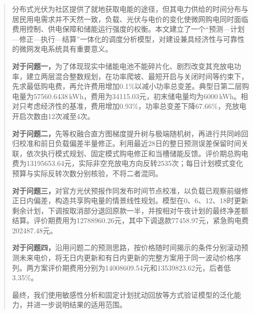 \begin{abstract}
分布式光伏为社区提供了就地获取电能的途径，但其电力供给的时间分布与居民用电需求并不天然一致，负载、光伏与电价的变化使微网购电同时面临费用控制、供电保障和储能运行强度的权衡。本文建立了一个“预测—计划—修正—执行—结算”一体化的调度分析模型，对建设兼具经济性与可靠性的微网发电系统具有重要意义。

\textbf{对于问题一，}为了体现现实中储能电池不能碎片化、剧烈改变其充放电功率，建立两层混合整数规划，在功率爬坡、最短开启与关闭时间等约束下，先求最低购电费，再允许费用增加0.1\%以减小功率总变差。典型日第二层购电量为57560.6438\,kWh，费用为34115.03元，初末储电量均为6000\,kWh。相对只考虑经济性的基准，费用增加0.93\%，功率总变差下降67.66\%，充放电开启次数由12次减至4次。

\textbf{对于问题二，}先等权融合直方图梯度提升树与极端随机树，再进行共同岭回归校准和前日负载偏差半量修正。利用最近28日的整日预测误差保留时间关联，依次执行模式规划、固定模式购电修正和当槽储能反馈。评价期总购电费为13195653.64元，实际非空充放电方向反转2535次；每日计划模式变化预算与实际反转次数分别核验，不将二者混同。

\textbf{对于问题三，}对官方光伏预报作同发布时间节点校准，以负载已观察前缀修正日内偏差，构造共享购电量的情景线性规划。模型在0、6、12、18时更新剩余计划，下调按取消部分退回原款一半，并按相对午夜计划的最终净差额结算。评价期费用为12788960.26元，其中下调退款77458.97元，紧急购电费202487.48元。

\textbf{对于问题四，}沿用问题二的预测思路，按价格随时间揭示的条件分别滚动预测未来电价，将无日内更新和有日内更新的完整方案用于同一波动价格序列。两方案评价期费用分别为14008609.54元和13539823.62元，后者低3.35\%。

最终，我们使用敏感性分析和固定计划扰动回放等方式验证模型的泛化能力，并进一步说明结果的适用范围。

\end{abstract}
